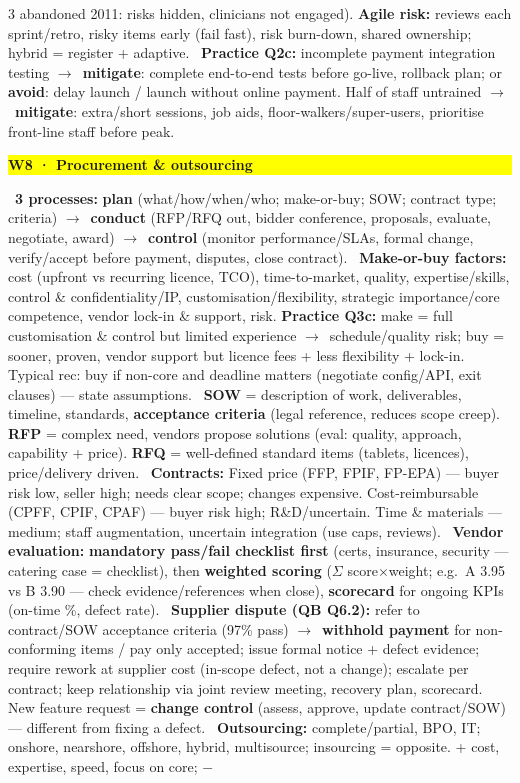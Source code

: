 \documentclass[a4paper,landscape]{article}
\newcommand{\hlhighlight}[1]{\begingroup\setlength{\fboxsep}{0pt}\colorbox{yellow}{\strut\textbf{#1}}\endgroup}
\newcommand{\concept}[1]{\textbf{#1}}
\newcommand{\lbl}[1]{\textbf{#1}}
\newcommand{\kh}[1]{{\setlength{\fboxsep}{0.5pt}\colorbox{keyhlcolor}{#1}}}
\newcommand{\ra}{$\rightarrow$}
\begin{document}
\begin{multicols}{3}
abandoned 2011: risks hidden, clinicians not engaged). \concept{Agile risk:} reviews each sprint/retro, risky items early (fail fast), risk burn-down, shared ownership; hybrid = register + adaptive. \textbullet\ \lbl{Practice Q2c:} incomplete payment integration testing \ra\ \lbl{mitigate}: complete end-to-end tests before go-live, rollback plan; or \lbl{avoid}: delay launch / launch without online payment. Half of staff untrained \ra\ \lbl{mitigate}: extra/short sessions, job aids, floor-walkers/super-users, prioritise front-line staff before peak.\par

\par\smallskip\noindent\hlhighlight{W8 · Procurement \& outsourcing}\ \concept{3 processes:} \lbl{plan} (what/how/when/who; make-or-buy; SOW; contract type; criteria) \ra\ \lbl{conduct} (RFP/RFQ out, bidder conference, proposals, evaluate, negotiate, award) \ra\ \lbl{control} (monitor performance/SLAs, formal change, \kh{verify/accept before payment}, disputes, close contract). \textbullet\ \concept{Make-or-buy factors:} cost (upfront vs recurring licence, TCO), time-to-market, quality, expertise/skills, control \& confidentiality/IP, customisation/flexibility, strategic importance/core competence, vendor lock-in \& support, risk. \lbl{Practice Q3c:} make = full customisation \& control but limited experience \ra\ schedule/quality risk; buy = sooner, proven, vendor support but licence fees + less flexibility + lock-in. Typical rec: \kh{buy} if non-core and deadline matters (negotiate config/API, exit clauses) --- state assumptions. \textbullet\ \concept{SOW} = description of work, deliverables, timeline, standards, \lbl{acceptance criteria} (legal reference, reduces scope creep). \concept{RFP} = complex need, vendors propose solutions (eval: quality, approach, capability + price). \concept{RFQ} = well-defined standard items (tablets, licences), price/delivery driven. \textbullet\ \concept{Contracts:} \kh{Fixed price} (FFP, FPIF, FP-EPA) --- buyer risk low, seller high; needs clear scope; changes expensive. \kh{Cost-reimbursable} (CPFF, CPIF, CPAF) --- buyer risk high; R\&D/uncertain. \kh{Time \& materials} --- medium; staff augmentation, uncertain integration (use caps, reviews). \textbullet\ \concept{Vendor evaluation:} \lbl{mandatory pass/fail checklist first} (certs, insurance, security --- catering case = checklist), then \lbl{weighted scoring} ($\Sigma$ score$\times$weight; e.g.\ A 3.95 vs B 3.90 --- check evidence/references when close), \lbl{scorecard} for ongoing KPIs (on-time \%, defect rate). \textbullet\ \concept{Supplier dispute (QB Q6.2):} refer to contract/SOW acceptance criteria (97\% pass) \ra\ \lbl{withhold payment} for non-conforming items / pay only accepted; issue formal notice + defect evidence; require rework at supplier cost (in-scope defect, not a change); escalate per contract; keep relationship via joint review meeting, recovery plan, scorecard. New feature request = \lbl{change control} (assess, approve, update contract/SOW) --- different from fixing a defect. \textbullet\ \concept{Outsourcing:} complete/partial, BPO, IT; onshore, nearshore, offshore, hybrid, multisource; insourcing = opposite. + cost, expertise, speed, focus on core; $-$ 
\end{multicols}
\end{document}

